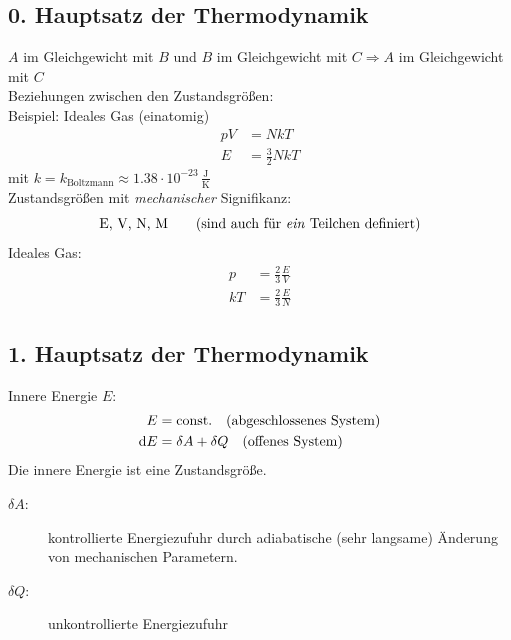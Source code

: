 \subsection{0. Hauptsatz der Thermodynamik}
$A$ im Gleichgewicht mit $B$ und $B$ im Gleichgewicht mit $C \Rightarrow A$ im Gleichgewicht mit $C$ \\
Beziehungen zwischen den Zustandsgrößen: \\
Beispiel: Ideales Gas (einatomig)
\begin{equation}
    \begin{split}
        p V &= N k T \\
        E &= \frac{3}{2} N k T
    \end{split}
\end{equation}
mit $k=k_\text{Boltzmann} \approx 1.38\cdot 10^{-23}\,\frac{\text{J}}{\text{K}}$ \\
Zustandsgrößen mit \emph{mechanischer} Signifikanz:
\begin{equation}
    $E, V, N, M$ \qquad \text{(sind auch für \emph{ein} Teilchen definiert)}
\end{equation}
Ideales Gas:
\begin{equation}
    \begin{split}
        p &= \frac{2}{3} \frac{E}{V} \\
        k T &= \frac{2}{3} \frac{E}{N}
    \end{split}
\end{equation}
\subsection{1. Hauptsatz der Thermodynamik}
Innere Energie $E$:
\begin{equation}
    \begin{split}
        E&=\text{const.} \quad \text{(abgeschlossenes System)} \\
        \mathrm{d} E &= \delta A + \delta Q \quad \text{(offenes System)}
    \end{split}
\end{equation}
Die innere Energie ist eine Zustandsgröße.
\begin{description}
    \item[$\delta A$:] kontrollierte Energiezufuhr durch adiabatische (sehr langsame) Änderung von mechanischen Parametern.
    \item[$\delta Q$:] unkontrollierte Energiezufuhr
\end{description}
